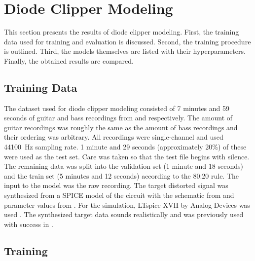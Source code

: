
\section{Diode Clipper Modeling}
\label{chap:diode_clipper}

This section presents the results of diode clipper modeling. First, the training data used for training and evaluation is discussed. Second, the training procedure is outlined. Third, the models themselves are listed with their hyperparameters. Finally, the obtained results are compared.

\subsection{Training Data}
\label{sec:diode_clipper_training_data}

The dataset used for diode clipper modeling consisted of 7 minutes and 59 seconds of guitar and bass recordings from \cite{Abesser2013} and \cite{Kehling2014} respectively. The amount of guitar recordings was roughly the same as the amount of bass recordings and their ordering was arbitrary. All recordings were single-channel and used \SI{44100}{Hz} sampling rate. 1 minute and 29 seconds (approximately 20\%) of these were used as the test set. Care was taken so that the test file begins with silence. The remaining data was split into the validation set (1 minute and 18 seconds) and the train set (5 minutes and 12 seconds) according to the 80:20 rule. The input to the model was the raw recording. The target distorted signal was synthesized from a SPICE model of the circuit with the schematic from  and parameter values from . For the simulation, LTspice XVII by Analog Devices was used \cite{LTspice}. The synthesized target data sounds realistically and was previously used with success in \cite{Wright2019}.

\subsection{Training}
\label{sec:diode_clipper_training}

